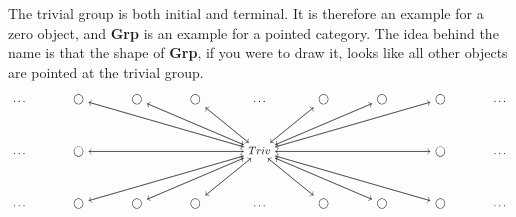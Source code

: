 The trivial group is both initial and terminal. It is therefore an example for a
zero object, and \textbf{Grp} is an example for a pointed category.
The idea behind the name is that the shape of \textbf{Grp}, if you were to draw it,
looks like all other objects are pointed at the trivial group.
\[
  \begin{tikzcd}[column sep=large]
    \dots
    & \bigcirc \arrow [drrr, ""]
    & \bigcirc \arrow[drr, ""]
    & \bigcirc \arrow[dr, ""]
    & \dots
    & \bigcirc \arrow[dl, ""]
    & \bigcirc \arrow[dll,""]
    & \bigcirc \arrow[dlll,""]
    & \dots \\[5mm]
    \dots
    & \bigcirc \arrow[rrr, ""]
    & & &
    Triv
    \arrow[dlll, ""]
    \arrow[dll, ""]
    \arrow[dl, ""]
    \arrow[dr, ""]
    \arrow[drr, ""]
    \arrow[drrr, ""]
    \arrow[ulll, ""]
    \arrow[ull, ""]
    \arrow[ul, ""]
    \arrow[ur, ""]
    \arrow[urr, ""]
    \arrow[urrr, ""]
    \arrow[rrr, ""]
    \arrow[lll, ""]
    & &
    &  \bigcirc \arrow[lll, ""]
    & \dots   \\[5mm]
    \dots
    & \bigcirc \arrow [urrr, ""]
    & \bigcirc \arrow[urr, ""]
    & \bigcirc \arrow[ur, ""]
    & \dots
    & \bigcirc \arrow[ul, ""]
    & \bigcirc \arrow[ull,""]
    & \bigcirc \arrow[ulll,""]
    & \dots
  \end{tikzcd}
\]


